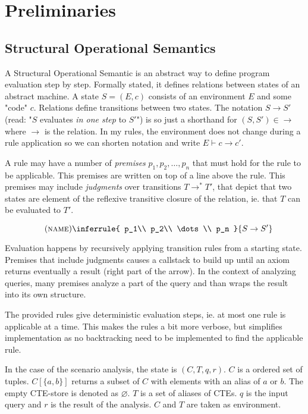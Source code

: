 \section{Preliminaries}\label{approach}

\subsection{Structural Operational Semantics}

A Structural Operational Semantic is an abstract way to define program evaluation step by step. Formally stated, it defines relations between states of an abstract machine. A state $S = (E, c)$ consists of an environment $E$ and some "code" $c$. Relations define transitions between two states. The notation $S \rightarrow S'$ (read: "$S$ evaluates \textit{in one step} to $S'$") is so just a shorthand for $(S, S') \in \rightarrow$ where $\rightarrow$ is the relation. In my rules, the environment does not change during a rule application so we can shorten notation and write $E \vdash c \rightarrow c'$. \cite[Chapter 2]{semanticsWithApplications}

A rule may have a number of \textit{premises} $p_1, p_2, \dots, p_n$ that must hold for the rule to be applicable. This premises are written on top of a line above the rule. This premises may include \textit{judgments} over transitions $T \rightarrow^* T'$, that depict that two states are element of the reflexive transitive closure of the relation, ie. that $T$ can be evaluated to $T'$.

$$\quad(\textsc{name})\inferrule{
   p_1\\
   p_2\\
   \dots\\
   p_n
}{
    S \rightarrow S'
}$$

Evaluation happens by recursively applying transition rules from a starting state. Premises that include judgments causes a callstack to build up until an axiom returns eventually a result (right part of the arrow). In the context of analyzing queries, many premises analyze a part of the query and than wraps the result into its own structure.

The provided rules give deterministic evaluation steps, ie. at most one rule is applicable at a time. This makes the rules a bit more verbose, but simplifies implementation as no backtracking need to be implemented to find the applicable rule.

In the case of the scenario analysis, the state is $(C, T, q, r)$. $C$ is a ordered set of tuples. $C[\{a, b\}]$ returns a subset of $C$ with elements with an alias of $a$ or $b$. The empty CTE-store is denoted as $\varnothing$. $T$ is a set of aliases of CTEs. $q$ is the input query and $r$ is the result of the analysis. $C$ and $T$ are taken as environment.

